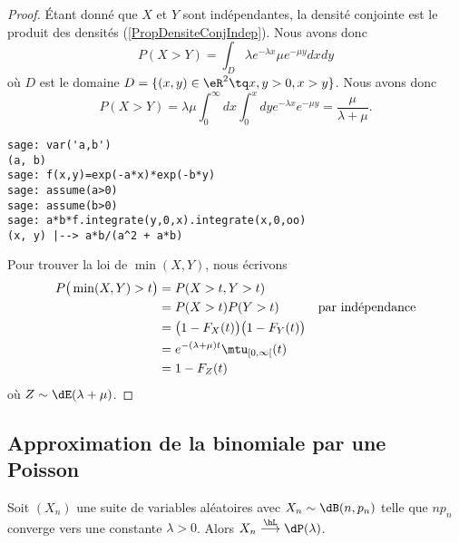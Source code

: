 \begin{proof}
    Étant donné que \( X\) et \( Y\) sont indépendantes, la densité conjointe est le produit des densités (\ref{PropDensiteConjIndep}). Nous avons donc
    \begin{equation}
        P(X>Y)=\int_D\lambda e^{-\lambda x}\mu e^{-\mu y}dxdy
    \end{equation}
    où \( D\) est le domaine \( D=\{ (x,y)\in \eR^2\tq x,y>0, x>y \}\). Nous avons donc
    \begin{equation}
        P(X>Y)=\lambda\mu\int_0^{\infty}dx\int_0^xdy  e^{-\lambda x} e^{-\mu y}=\frac{ \mu }{ \lambda+\mu }.
    \end{equation}
    \begin{verbatim}
sage: var('a,b')
(a, b)
sage: f(x,y)=exp(-a*x)*exp(-b*y)
sage: assume(a>0)
sage: assume(b>0)
sage: a*b*f.integrate(y,0,x).integrate(x,0,oo)
(x, y) |--> a*b/(a^2 + a*b)
    \end{verbatim}
    
    Pour trouver la loi de \( \min(X,Y)\), nous écrivons
    \begin{subequations}
        \begin{align}
            P\big( \min(X,Y)>t \big)&=P(X>t,Y>t)\\
            &=P(X>t)P(Y>t)  &\text{par indépendance}\\
            &=\big( 1-F_X(t) \big)\big( 1-F_Y(t) \big)\\
            &= e^{-(\lambda+\mu)t}\mtu_{\mathopen[ 0 , \infty [}(t)\\
            &=1-F_Z(t)
        \end{align}
    \end{subequations}
    où \( Z\sim \dE(\lambda+\mu)\).
\end{proof}

\subsection{Approximation de la binomiale par une Poisson}

\begin{proposition}
    Soit \( (X_n)\) une suite de variables aléatoires avec \( X_n\sim\dB(n,p_n)\) telle que \( np_n\) converge vers une constante \( \lambda>0\). Alors \( X_n\stackrel{\hL}{\longrightarrow}\dP(\lambda)\).
\end{proposition}

